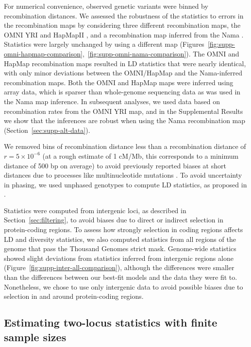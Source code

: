 \documentclass[]{article}
\begin{document}
For numerical convenience, observed genetic variants were binned by
recombination distances. We assessed the robustness of the statistics to errors
in the recombination maps by considering three different recombination maps,
the OMNI YRI and HapMapII
\citep{1000_Genomes_Project_Consortium2015-zq,International_HapMap_Consortium2007-vn},
and a recombination map inferred from the Nama \citep{Van_Eeden2022-od}.
Statistics were largely unchanged by using a different map
(Figures~\ref{fig:supp-omni-hapmap-comparison},~\ref{fig:supp-omni-nama-comparison}).
The OMNI and HapMap recombination maps resulted in LD statistics that were
nearly identical, with only minor deviations between the OMNI/HapMap and the
Nama-inferred recombination maps. Both the OMNI and HapMap maps were inferred
using array data, which is sparser than whole-genome sequencing data as was
used in the Nama map inference. In subsequent analyses, we used data based on
recombination rates from the OMNI YRI map, and in the Supplemental Results we
show that the inferences are robust when using the Nama recombination map
(Section~\ref{sec:supp-alt-data}).

We removed bins of recombination distance less than a recombination distance of
$r = 5\times10^{-6}$ (at a rough estimate of 1 cM/Mb, this corresponds to a minimum
distance of 500 bp on average) to avoid previously reported biases at short
distances due to processes like multinucleotide mutations
\citep{Harris2014-zg,Ragsdale2019-nt}. To avoid uncertainty in phasing, we used
unphased genotypes to compute LD statistics, as proposed in
\citet{Ragsdale2020-nz}. 

Statistics were computed from intergenic loci, as described in
Section~\ref{sec:filtering}, to avoid biases due to direct or indirect
selection in protein-coding regions. To assess how strongly selection in coding
regions affects LD and diversity statistics, we also computed statistics from
all regions of the genome that pass the Thousand Genomes strict mask.
Genome-wide statistics showed slight deviations from statistics inferred from
intergenic regions alone (Figure~\ref{fig:supp-inter-all-comparison}), although
the differences were smaller than the differences between our best-fit models
and the data they were fit to. Nonetheless, we chose to use only intergenic
data to avoid possible biases due to selection in and around protein-coding
regions.

\subsection{Estimating two-locus statistics with finite sample sizes}
\end{document}
